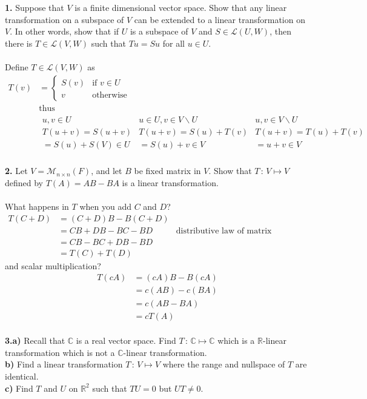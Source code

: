 \documentclass[11pt]{amsart}
\theoremstyle{definition}  %
\newcommand{\R}{\mathbb{R}}
\newcommand{\C}{\mathbb{C}}
\begin{document}

\noindent
{\bf 1.} Suppose that $V$ is a finite dimensional vector space. Show that any linear transformation on a subspace of $V$ can be extended to a 
linear transformation on $V$. In other words, show that if $U$ is a subspace of $V$ and $S \in \mathcal{L}(U,W)$, then there is 
$T \in \mathcal{L}(V,W)$ such that $Tu = Su$ for all $u \in U$. \\
\\
Define $T\in \mathcal{L}(V,W)$ as 
\begin{align*}
	T(v) &= \left \{ \begin{array}{ll}
		S(v) & \text{if } v \in U\\
		v & \text{otherwise }	
	\end{array} \right .\\
	&\text{thus}\\
	&\begin{array}{c|c|c}
		u,v \in U & u \in U, v \in V\backslash U& u,v \in V \backslash U \\\hline
		T(u+v)=S(u+v) &T(u+v)=S(u)+T(v) &T(u+v)=T(u)+T(v)\\
		=S(u)+S(V) \in U & = S(u)+v \in V &=u+v \in V 
	\end{array}
\end{align*}  
\\

\vskip 0.1cm
\noindent
{\bf 2.} Let $V = \mathcal{M}_{n \times n}(F)$, and let $B$ be fixed matrix in $V$. Show that $T \, : \, V \mapsto V$ defined by
$T(A) = AB-BA$ is a linear transformation. \\
\\
What happens in $T$ when you add $C$ and $D$?\
\begin{align*}
	T(C+D) &= (C+D)B-B(C+D) \\
	&= CB+DB -BC-BD & \text{distributive law of matrix multiplication}\\
	&= CB-BC+DB-BD \\
	&= T(C)+ T(D)
\end{align*}and scalar multiplication?
\begin{align*}
	T(cA) &= (cA)B-B(cA) \\
	&= c(AB)-c(BA) \\
	&= c(AB-BA) \\
	&= cT(A)
\end{align*}
\\

\vskip 0.1cm
\noindent
{\bf 3.a)} Recall that $\C$ is a real vector space. Find $T \, : \, \C \mapsto \C$ which is a $\R$-linear transformation which is not a 
$\C$-linear transformation. \\
{\bf b)} Find a linear transformation $T \, : \, V \mapsto V$ where the range and nullspace of $T$ are identical. \\
{\bf c)} Find $T$ and $U$ on $\R^2$ such that $TU = 0$ but $UT \neq 0$. \\
\end{document}
